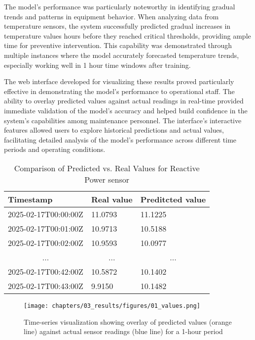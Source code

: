 The model's performance was particularly noteworthy in identifying gradual trends and patterns in equipment behavior. When analyzing data from temperature sensors, the system successfully predicted gradual increases in temperature values hours before they reached critical thresholds, providing ample time for preventive intervention. This capability was demonstrated through multiple instances where the model accurately forecasted temperature trends, especially working well in 1 hour time windows after training.

The web interface developed for visualizing these results proved particularly effective in demonstrating the model's performance to operational staff. The ability to overlay predicted values against actual readings in real-time provided immediate validation of the model's accuracy and helped build confidence in the system's capabilities among maintenance personnel. The interface's interactive features allowed users to explore historical predictions and actual values, facilitating detailed analysis of the model's performance across different time periods and operating conditions.

\begin{table}[H]
    \centering
    \begin{tabular}{|l|l|l|}
    \hline
    Timestamp                 & Real value               & Preditcted value         \\ \hline
    2025-02-17T00:00:00Z      & 11.0793                  & 11.1225                  \\ \hline
    2025-02-17T00:01:00Z      & 10.9713                  & 10.5188                  \\ \hline
    2025-02-17T00:02:00Z      & 10.9593                  & 10.0977                  \\ \hline
    \multicolumn{1}{|c|}{...} & \multicolumn{1}{c|}{...} & \multicolumn{1}{c|}{...} \\ \hline
    2025-02-17T00:42:00Z      & 10.5872                  & 10.1402                  \\ \hline
    2025-02-17T00:43:00Z      & 9.9150                   & 10.1482                  \\ \hline
    \end{tabular}
    \caption{Comparison of Predicted vs. Real Values for Reactive Power sensor}
    \label{table:time-series-data}
\end{table}

\begin{figure}[H]
    \centering
    \texttt{[image: chapters/03\_results/figures/01\_values.png]}
    \caption{Time-series visualization showing overlay of predicted values (orange line) against actual sensor readings (blue line) for a 1-hour period}
    \label{figure:graph-values}
\end{figure}